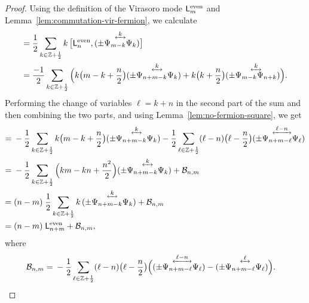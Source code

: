 \documentclass[12pt,oneside,english]{amsart}
\numberwithin{equation}{section}
\numberwithin{figure}{section}
\theoremstyle{plain}
\theoremstyle{plain}
\theoremstyle{plain}
\theoremstyle{plain}
\theoremstyle{remark}
\theoremstyle{definition}
\theoremstyle{plain}
\theoremstyle{plain}
\numberwithin{thm}{section}
\begin{document}
\begin{proof}
Using the definition of the Virasoro mode $\mathsf{L}_{m}^{\mathrm{even}}$ and 
Lemma~\ref{lem:commutation-vir-fermion}, we calculate
\begin{align*}
[\virL{n}^{\abbrEven} , \virL{m}^{\abbrEven}]
= \; & \frac{1}{2} \sum_{k\in\Z +\frac{1}{2}} 
	k \, \big[ \virL{n}^{\abbrEven} ,
		  \ourforder{\fermmode_{m-k}}{\fermmode_{k}}{k} \big] \\
= \; & \frac{-1}{2} \sum_{k\in\Z +\frac{1}{2}} 
	\Big( k \big( m-k+\frac{n}{2} \big)
	        \ourforder{\fermmode_{n+m-k}}{\fermmode_{k}}{k}
	    + k \big( k+\frac{n}{2} \big)
	        \ourforder{\fermmode_{m-k}}{\fermmode_{n+k}}{k}
	\Big) .
\end{align*}
Performing the change of variables $\ell = k+n$ in the second part of the sum 
and then combining the two parts, and using Lemma~\ref{lem:no-fermion-square}, 
we get
\begin{align*}
[\virL{n}^{\abbrEven} , \virL{m}^{\abbrEven}]
= \; & -\frac{1}{2} \sum_{k\in\Z +\frac{1}{2}} 
	k \big( m-k+\frac{n}{2} \big)
	        \ourforder{\fermmode_{n+m-k}}{\fermmode_{k}}{k}
	- \frac{1}{2} \sum_{\ell\in\Z +\frac{1}{2}} 
	    (\ell - n) \big( \ell-\frac{n}{2} \big)
	        \ourforder{\fermmode_{n+m-\ell}}{\fermmode_{\ell}}{\ell-n}  \\
= \; & -\frac{1}{2} \sum_{k\in\Z +\frac{1}{2}} 
	\Big( km-kn+\frac{n^2}{2} \Big)
	        \ourforder{\fermmode_{n+m-k}}{\fermmode_{k}}{k}
	+ \mathcal{B}_{n,m} \\
= \; & (n-m) \; \frac{1}{2} \sum_{k\in\Z +\frac{1}{2}}
			k \, \ourforder{\fermmode_{n+m-k}}{\fermmode_{k}}{k}
	+ \mathcal{B}_{n,m} \\
= \; & (n-m) \; \virL{n+m}^{\abbrEven} + \mathcal{B}_{n,m} ,
\end{align*}
where
\begin{align*}
\mathcal{B}_{n,m}
= \; & - \frac{1}{2} \sum_{\ell\in\Z +\frac{1}{2}} 
	    (\ell - n) \big( \ell-\frac{n}{2} \big) \Big(
	        \ourforder{\fermmode_{n+m-\ell}}{\fermmode_{\ell}}{\ell-n}
	        - \ourforder{\fermmode_{n+m-\ell}}{\fermmode_{\ell}}{\ell}
	\Big) .
\end{align*}

\end{proof}
\end{document}
